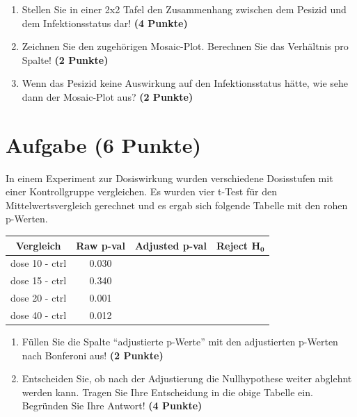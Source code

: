 \documentclass[a4paper, 10pt]{scrartcl}\usepackage[]{graphicx}\usepackage[]{xcolor}
\begin{document}
\begin{enumerate}
\item Stellen Sie in einer 2x2 Tafel den Zusammenhang zwischen dem
  Pesizid und dem Infektionsstatus dar! \textbf{(4 Punkte)}
\item Zeichnen Sie den zugeh{\"o}rigen Mosaic-Plot. Berechnen Sie das
  Verh{\"a}ltnis pro Spalte! \textbf{(2 Punkte)}
\item Wenn das Pesizid keine Auswirkung auf den Infektionsstatus h{\"a}tte, wie
  sehe dann der Mosaic-Plot aus? \textbf{(2 Punkte)}
\end{enumerate} 
\clearpage

\section{Aufgabe \hfill (6 Punkte)}

In einem Experiment zur Dosiswirkung wurden verschiedene Dosisstufen mit
einer Kontrollgruppe vergleichen. Es wurden vier t-Test f{\"u}r den
Mittelwertsvergleich gerechnet und es ergab sich folgende Tabelle mit den
rohen p-Werten.



\begin{center}
  \Large
  \begin{tabular}{c|c|c|c}
    \textbf{Vergleich} & \textbf{Raw p-val} & \textbf{Adjusted p-val} &
                                                                        \textbf{Reject $\boldsymbol{H_0}$} \strut\\
    \hline
    dose 10 - ctrl  & 0.030 &  &\strut\\
    \hline
    dose 15 - ctrl  & 0.340 & &\strut\\
    \hline
    dose 20 - ctrl  & 0.001 & &\strut\\
    \hline
    dose 40 - ctrl  & 0.012 & &\strut\\
  \end{tabular}
\end{center}

\begin{enumerate}
\item F{\"u}llen Sie die Spalte "`adjustierte p-Werte"' mit den adjustierten
  p-Werten nach Bonferoni aus! \textbf{(2 Punkte)}
\item Entscheiden Sie, ob nach der Adjustierung die Nullhypothese weiter
  abglehnt werden kann. Tragen Sie Ihre Entscheidung in die obige Tabelle
  ein. Begr{\"u}nden Sie Ihre Antwort! \textbf{(4 Punkte)}
\end{enumerate}
\end{document}
